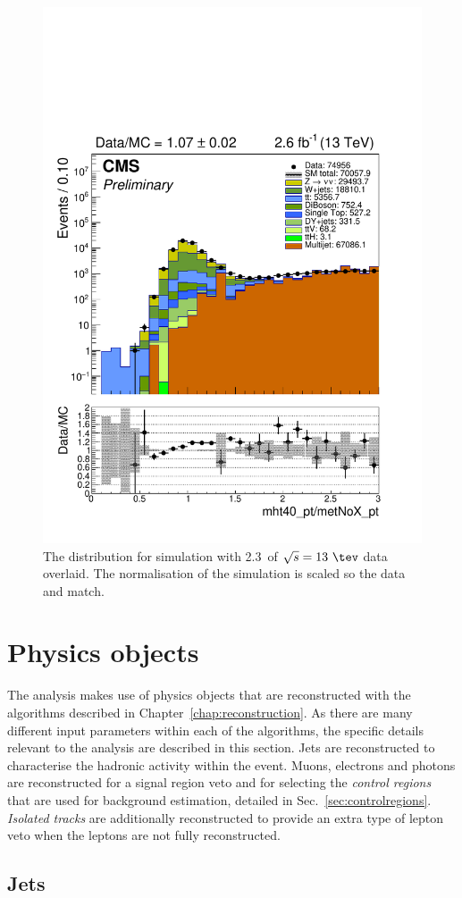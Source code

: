 \begin{figure}
	\begin{center}
		\includegraphics[width=0.5\linewidth]{figs/analysis/eventSelection/mht40_pt_Div_metNoX_pt_all_all_80X_noOverflow_scaled0p6}%
	\end{center}
  \caption{The \mhtmet distribution for \MC simulation with
  2.3~\ifb of $\sqrt{s}=13~\tev$ data overlaid. The
  normalisation of the \MC simulation is scaled so the data and \MC
  match.}
	\label{fig:mhtDivMet}
\end{figure}

\section{Physics objects} %
\label{sec:physobj}

The analysis makes use of physics objects that are reconstructed with
the algorithms described in Chapter~\ref{chap:reconstruction}. As
there are many different input parameters within each of the
algorithms, the specific details relevant to the analysis are
described in this section. Jets are reconstructed to characterise the
hadronic activity within the event. Muons, electrons and photons are
reconstructed for a signal region veto and for selecting the \emph{control
regions} that are used for background estimation, detailed in
Sec.~\ref{sec:controlregions}. \emph{Isolated tracks} are additionally
reconstructed to provide an extra type of lepton veto when the leptons
are not fully reconstructed.

\subsection{Jets}
\label{sec:evSel_jets}

